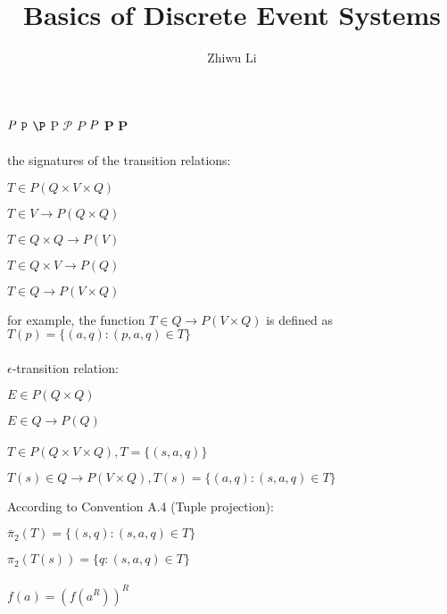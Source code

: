 \documentclass[graybox,envcountchap,sectrefs]{svmono1}
\begin{document}
\author{Zhiwu Li}
\title{Basics of Discrete Event Systems}
\maketitle










%
%
%
%
%

%
%


$\emph{P}$ $\texttt{P}$ $\P$  $\mathrm{P}$  $\mathcal{P}$ $\mathit{P}$  $\mathnormal{P}$  $\boldsymbol{P}$  $\mathbf{P}$
\\
\\
the signatures of the transition relations:

$T \in P(Q \times V \times Q)$

$T \in V \to P(Q \times Q)$

$T \in Q\times Q \to P(V)$

$T \in Q \times V \to P(Q)$

$T \in Q \to P(V \times Q)$

for example, the function $T \in Q \to P(V \times Q)$ is defined as $T(p) = \{(a,q):(p,a,q) \in T\}$
\\
\\
$\epsilon$-transition relation:

$E \in P(Q\times Q)$

$E \in Q \to P(Q)$
\\
\\
\indent
$T \in P(Q \times V \times Q), T = \{(s,a,q) \}$

$T(s)\in Q \to P(V\times Q), T(s) = \{(a,q):(s,a,q) \in T\}$

According to Convention A.4 (Tuple projection):

$\bar{\pi}_2(T) = \{(s,q): (s,a,q)\in T \}$ 

$\pi_2(T(s)) = \{ q : (s,a,q) \in T\}$  
\\
\\
$f(a)=(f(a^R))^R$
\end{document}

